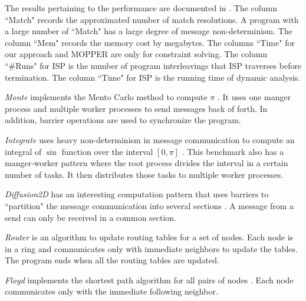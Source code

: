 The results pertaining to the performance are documented in . The column ``Match" records the approximated number of match resolutions. A program with a large number of ``Match" has a large degree of message non-determinism. The column ``Mem" records the memory cost by megabytes. The columns ``Time" for our approach and MOPPER are only for constraint solving. The column ``\#Runs" for ISP is the number of program interleavings that ISP traverses before termination. The column ``Time" for ISP is the running time of dynamic analysis. 


\textit{Monte} implements the Mento Carlo method to compute $\pi$ \cite{benchmark:mentoCarlo}. It uses one manger process and multiple worker processes to send messages back of forth. In addition, barrier operations are used to synchronize the program. 

\textit{Integrate} uses heavy non-determinism in message communication to compute an integral of $\sin$ function over the interval $[0, \pi]$ \cite{benchmark:fevs}. This benchmark also has a manger-worker pattern where the root process divides the interval in a certain number of tasks. It then distributes those tasks to multiple worker processes.
 
\textit{Diffusion2D} has an interesting computation pattern that uses barriers to ``partition" the message communication into several sections \cite{benchmark:fevs}. A message from a send can only be received in a common section. 

\textit{Router} is an algorithm to update routing tables for a set of nodes. Each node is in a ring and communicates only with immediate neighbors to update the tables. The program ends when all the routing tables are updated. 

\textit{Floyd} implements the shortest path algorithm for all pairs of nodes \cite{}. Each node communicates only with the immediate following neighbor.

